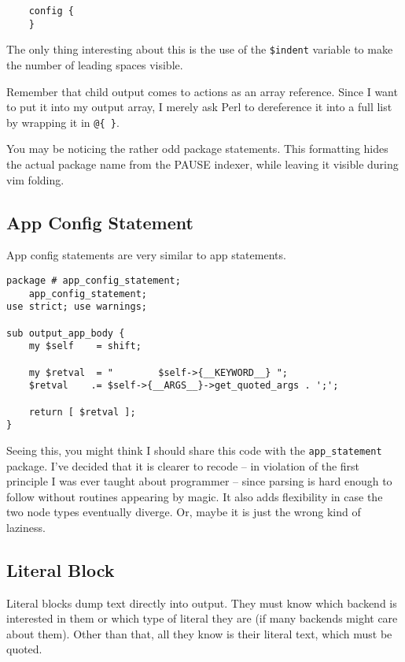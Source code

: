 \begin{verbatim}
    config {
    }
\end{verbatim}

The only thing interesting about this is the use of the \verb+$indent+
variable to make the number of leading spaces visible.

Remember that child output comes to actions as an array reference.
Since I want to put it into my output array, I merely ask Perl to
dereference it into a full list by wrapping it in \verb+@{ }+.

You may be noticing the rather odd package statements.  This formatting
hides the actual package name from the PAUSE indexer, while leaving it
visible during vim folding.

\subsection*{App Config Statement}

App config statements are very similar to app statements.

\begin{verbatim}
package # app_config_statement;
    app_config_statement;
use strict; use warnings;

sub output_app_body {
    my $self    = shift;

    my $retval  = "        $self->{__KEYWORD__} ";
    $retval    .= $self->{__ARGS__}->get_quoted_args . ';';

    return [ $retval ];
}
\end{verbatim}

Seeing this, you might think I should share this code with the
\verb+app_statement+ package.  I've decided that it is clearer to recode
-- in violation of the first principle I was ever taught about programmer --
since parsing is hard enough to follow without routines appearing
by magic.  It also adds flexibility in case the two node types eventually
diverge.  Or, maybe it is just the wrong kind of laziness.

\subsection*{Literal Block}

Literal blocks dump text directly into output.  They must know which
backend is interested in them or which type of literal they are (if
many backends might care about them).  Other than that, all they know
is their literal text, which must be quoted.

